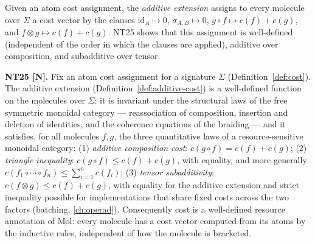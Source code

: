 \begin{definition}\label{def:additive-cost}
Given an atom cost assignment, the \emph{additive extension} assigns to every
molecule over $\Sigma$ a cost vector by the clauses
$\mathrm{id}_A \mapsto 0$, $\sigma_{A,B} \mapsto 0$,
$g \circ f \mapsto c(f) + c(g)$, and $f \otimes g \mapsto c(f) + c(g)$.
NT25 shows that this assignment is well-defined (independent of the order in
which the clauses are applied), additive over composition, and subadditive
over tensor.
\end{definition}

\begin{theorem}\label{nt:25}
\textbf{NT25 [N].} Fix an atom cost assignment for a signature $\Sigma$
(Definition~\ref{def:cost}). The additive extension
(Definition~\ref{def:additive-cost}) is a well-defined function on the
molecules over $\Sigma$: it is invariant under the structural laws of the free
symmetric monoidal category --- reassociation of composition, insertion and
deletion of identities, and the coherence equations of the braiding --- and it
satisfies, for all molecules $f, g$, the three quantitative laws of a
resource-sensitive monoidal category:
(1) \emph{additive composition cost}: $c(g \circ f) = c(f) + c(g)$;
(2) \emph{triangle inequality}: $c(g \circ f) \le c(f) + c(g)$, with equality,
and more generally $c(f_1 \circ \cdots \circ f_n) \le \sum_{i=1}^{n} c(f_i)$;
(3) \emph{tensor subadditivity}: $c(f \otimes g) \le c(f) + c(g)$, with
equality for the additive extension and strict inequality possible for
implementations that share fixed costs across the two factors (batching,
\autoref{ch:operad}).
Consequently cost is a well-defined resource annotation of Mol: every molecule
has a cost vector computed from its atoms by the inductive rules, independent
of how the molecule is bracketed.
\end{theorem}

